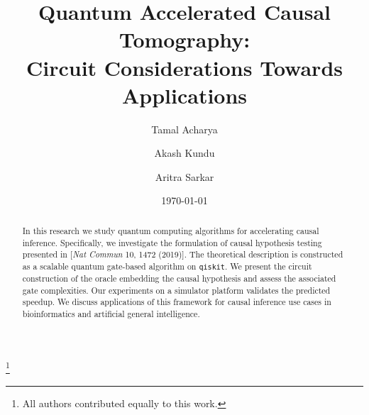 \documentclass[%
 aps,
 jmp,%
 amsmath,amssymb,
 reprint,%
]{revtex4-2}
\begin{document}

\title[Quantum Accelerated Causal Tomography...]{Quantum Accelerated Causal Tomography: \\Circuit Considerations Towards Applications}%
\thanks{All authors contributed equally to this work.}

\author{Tamal Acharya}
%
\author{Akash Kundu}

%
\author{Aritra Sarkar}
%

\date{\today}%

\begin{abstract}
In this research we study quantum computing algorithms for accelerating causal inference.
Specifically, we investigate the formulation of causal hypothesis testing presented in [\textit{Nat Commun} 10, 1472 (2019)].
The theoretical description is constructed as a scalable quantum gate-based algorithm on \texttt{qiskit}.
We present the circuit construction of the oracle embedding the causal hypothesis and assess the associated gate complexities.
Our experiments on a simulator platform validates the predicted speedup.
We discuss applications of this framework for causal inference use cases in bioinformatics and artificial general intelligence.
\end{abstract}

\maketitle

\end{document}
